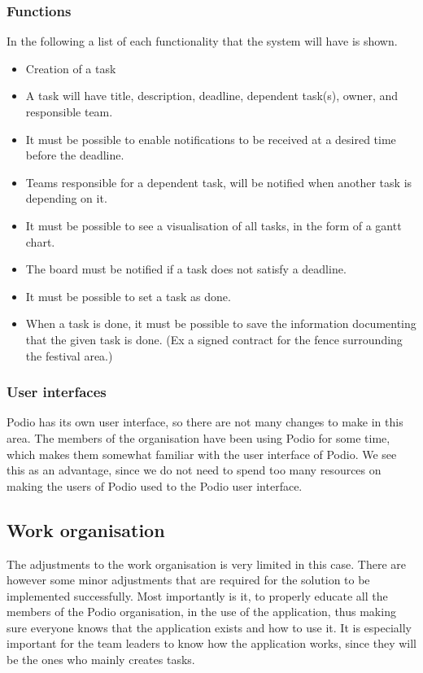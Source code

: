 \subsubsection{Functions}
In the following a list of each functionality that the system will have is shown.
\begin{itemize}
    \item Creation of a task
    \item A task will have title, description, deadline, dependent task(s), owner, and responsible
    team.
    \item It must be possible to enable notifications to be received at a desired time before the
    deadline.
    \item Teams responsible for a dependent task, will be notified when another task is depending on
    it.
    \item It must be possible to see a visualisation of all tasks, in the form of a gantt chart.
    \item The board must be notified if a task does not satisfy a deadline.
    \item It must be possible to set a task as done.
    \item When a task is done, it must be possible to save the information documenting that the
    given task is done. (Ex a signed contract for the fence surrounding the festival area.)
\end{itemize}

\subsubsection{User interfaces}
Podio has its own user interface, so there are not many changes to make in this area. The members of
the organisation have been using Podio for some time, which makes them somewhat familiar with the
user interface of Podio. We see this as an advantage, since we do not need to spend too many
resources on making the users of Podio used to the Podio user interface.

\subsection{Work organisation}
\label{sub:work_organisation}
The adjustments to the work organisation is very limited in this case. There are however some
minor adjustments that are required for the solution to be implemented successfully. 
Most importantly is it, to properly educate all the members of the Podio organisation, in the use of
the application, thus making sure everyone knows that the application exists and how to use it. It
is especially important for the team leaders to know how the application works, since they will be
the ones who mainly creates tasks. 

